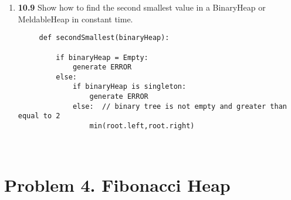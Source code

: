 \documentclass{article}
\begin{document}
\begin{enumerate}
\begin{enumerate}
\begin{center}
	\end{center}
	
	
	\end{enumerate}	

	 \item \textbf{10.9}
	 Show how to find the second smallest value in a BinaryHeap or MeldableHeap in constant time.
	 
	 \begin{verbatim}
	 def secondSmallest(binaryHeap): 
		 
		 if binaryHeap = Empty:
			 generate ERROR  
		 else: 
			 if binaryHeap is singleton:
				 generate ERROR 
			 else:  // binary tree is not empty and greater than equal to 2
				 min(root.left,root.right) 
		 
	 
	 \end{verbatim}
	 
	 \pagebreak
	\end{enumerate}
\section*{Problem 4. Fibonacci Heap}
\end{document}

